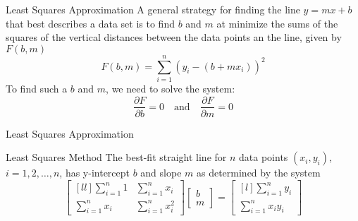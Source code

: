 \documentclass{beamer}
\begin{document}
\begin{frame}{Least Squares Approximation}
A general strategy for finding the line $y=mx+b$ that best describes a data set is to find $b$ and $m$ at minimize the sums of the squares of the vertical distances between the data points an the line, given by $F(b,m)$
\begin{equation*}
F(b,m)=\sum\limits_{i=1}^{n}{\left(y_i-(b+mx_i)\right)}^2
\end{equation*}\pause
To find such a $b$ and $m$, we need to solve the system:
\begin{equation*}
\dfrac{\partial F}{\partial b}=0
\quad\text{and}\quad
\dfrac{\partial F}{\partial m}=0
\end{equation*}
\end{frame}

\begin{frame}{Least Squares Approximation}
\begin{block}{Least Squares Method}
The best-fit straight line for $n$ data points $(x_i, y_i)$, $i=1,2,\dots,n$, has y-intercept $b$ and slope $m$ as determined by the system
\begin{equation*}
\begin{bmatrix}[ll]
\sum\limits_{i=1}^n 1   & \sum\limits_{i=1}^n x_i   \\
\sum\limits_{i=1}^n x_i & \sum\limits_{i=1}^n x_i^2
\end{bmatrix}
\begin{bmatrix}
b \\
m
\end{bmatrix}
=
\begin{bmatrix}[l]
\sum\limits_{i=1}^n y_i \\
\sum\limits_{i=1}^n x_i y_i
\end{bmatrix}
\end{equation*}
\end{block}
\end{frame}
\end{document}
